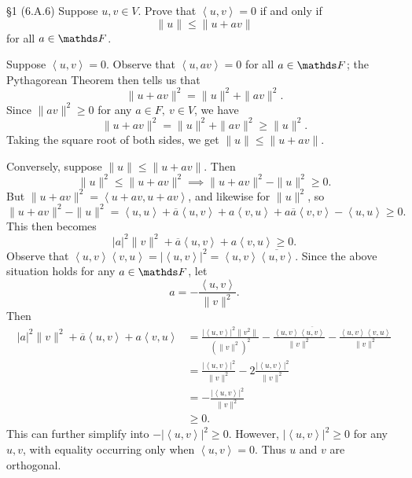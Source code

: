\documentclass{homework}
\begin{document}
\begin{problem}{\S 1}
  (6.A.6) Suppose $u,v\in V$. Prove that $\left<u,v \right>=0$ if and only if \[
    \|u\|\le \|u+av\|
  \] for all $a\in \F$.
\end{problem}
\begin{solution}
  Suppose $\left<u,v \right>=0$. Observe that $\left<u,av \right> =0$ for all $a\in \F$; the
  Pythagorean Theorem then tells us that \[
    \|u+av\|^2=\|u\|^2+\|av\|^2
  .\] Since $\|av\|^2\ge 0$ for any $a\in F,\ v\in V$, we have \[
    \|u+av\|^2=\|u\|^2+\|av\|^2\ge \|u\|^2
  .\] Taking the square root of both sides, we get $\|u\|\le \|u+av\|$.

  Conversely, suppose $\|u\|\le \|u+av\|$. Then \[
    \|u\|^2\le \|u+av\|^2 \implies \|u+av\|^2-\|u\|^2\ge 0  
  .\] But $\|u+av\|^2=\left<u+av,u+av \right> $, and likewise for $\|u\|^2$, so \[
    \|u+av\|^2-\|u\|^2=\left<u,u \right> +\overline{a}\left<u,v \right> +a\left<v,u \right>
    +a\overline{a}\left<v,v \right> -\left<u,u \right> \ge 0
  .\] This then becomes \[
    \left| a \right| ^2\|v\|^2+\overline{a}\left<u,v \right> +a\left<v,u \right> \ge 0
  .\] Observe that $\left<u,v \right> \left<v,u \right> =\left| \left<u,v \right>  \right|
  ^2=\left<u,v \right> \overline{\left<u,v \right>} $.  Since the above situation holds for any
  $a\in \F$, let
  \[
    a=-\frac{\left<u,v \right> }{\|v\|^2}
  .\] Then
  \begin{align*}
    \left| a \right| ^2\|v\|^2+\overline{a}\left<u,v \right> +a\left<v,u \right> &= \frac{\left|
    \left<u,v \right>  \right| ^2\|v^2\|}{(\|v\|^2)^2}-\frac{\left<u,v \right> \overline{\left<u,v \right>}
  }{\|v\|^2}-\frac{\left<u,v \right> \left<v,u \right> }{\|v\|^2}\\
  &= \frac{\left| \left<u,v \right>  \right|^2 }{\|v\|^2}-2 \frac{\left| \left<u,v \right>  \right|
  ^2}{\|v\|^2}\\
  &= -\frac{\left| \left<u,v \right>  \right| ^2}{\|v\|^2}\\
  &\ge 0
  .\end{align*}
  This can further simplify into $-\left| \left<u,v \right>  \right| ^2\ge 0$. However, $\left|
  \left<u,v \right>  \right| ^2\ge 0$ for any $u,v$, with equality occurring only when $\left<u,v
  \right> =0$. Thus $u$ and $v$ are orthogonal.
\end{solution}
\end{document}
